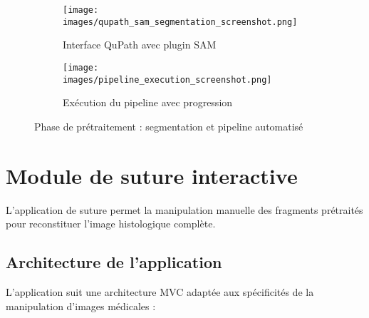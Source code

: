 \documentclass[11pt,a4paper]{report}
\begin{document}
\begin{figure}[htbp]
\centering
\begin{subfigure}[b]{0.48\textwidth}
    \texttt{[image: images/qupath\_sam\_segmentation\_screenshot.png]}
    \caption{Interface QuPath avec plugin SAM}
\end{subfigure}
\hfill
\begin{subfigure}[b]{0.48\textwidth}
    \texttt{[image: images/pipeline\_execution\_screenshot.png]}
    \caption{Exécution du pipeline avec progression}
\end{subfigure}
\caption{Phase de prétraitement : segmentation et pipeline automatisé}
\end{figure}

\section{Module de suture interactive}

L'application de suture permet la manipulation manuelle des fragments prétraités pour reconstituer l'image histologique complète.

\subsection{Architecture de l'application}

L'application suit une architecture MVC adaptée aux spécificités de la manipulation d'images médicales :
\end{document}
